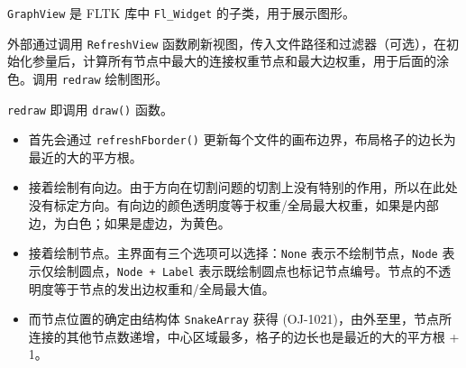\documentclass[
]{article}
\begin{document}
\texttt{GraphView} 是 FLTK 库中 \texttt{Fl\_Widget}
的子类，用于展示图形。

外部通过调用 \texttt{RefreshView}
函数刷新视图，传入文件路径和过滤器（可选），在初始化参量后，计算所有节点中最大的连接权重节点和最大边权重，用于后面的涂色。调用
\texttt{redraw} 绘制图形。

\texttt{redraw} 即调用 \texttt{draw()} 函数。

\begin{itemize}
\item
  首先会通过 \texttt{refreshFborder()}
  更新每个文件的画布边界，布局格子的边长为最近的大的平方根。
\item
  接着绘制有向边。由于方向在切割问题的切割上没有特别的作用，所以在此处没有标定方向。有向边的颜色透明度等于权重/全局最大权重，如果是内部边，为白色；如果是虚边，为黄色。
\item
  接着绘制节点。主界面有三个选项可以选择：\texttt{None}
  表示不绘制节点，\texttt{Node} 表示仅绘制圆点，\texttt{Node\ +\ Label}
  表示既绘制圆点也标记节点编号。节点的不透明度等于节点的发出边权重和/全局最大值。
\item
  而节点位置的确定由结构体 \texttt{SnakeArray} 获得
  (OJ-1021)，由外至里，节点所连接的其他节点数递增，中心区域最多，格子的边长也是最近的大的平方根
  + 1。
\end{itemize}
\end{document}
